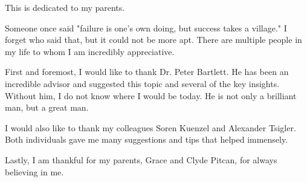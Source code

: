 \documentclass{ucbthesis}
\begin{document}
\begin{frontmatter}

\begin{dedication}
\null\vfil
\begin{center}
This is dedicated to my parents.
\end{center}
\vfil\null
\end{dedication}


\tableofcontents
\clearpage
\listoffigures
\clearpage
\listoftables

\begin{acknowledgements}
	
Someone once said "failure is one's own doing, but success takes a village." I forget who said that, but it could not be more apt. There are multiple people in my life to whom I am incredibly appreciative.

First and foremost, I would like to thank Dr. Peter Bartlett. He has been an incredible advisor and suggested this topic and several of the key insights. Without him, I do not know where I would be today. He is not only a brilliant man, but a great man.

I would also like to thank my colleagues Soren Kuenzel and Alexander Tsigler. Both individuals gave me many suggestions and tips that helped immensely.

Lastly, I am thankful for my parents, Grace and Clyde Pitcan, for always believing in me.

\end{acknowledgements}

\end{frontmatter}

\pagestyle{headings}








\printbibliography

\end{document}
